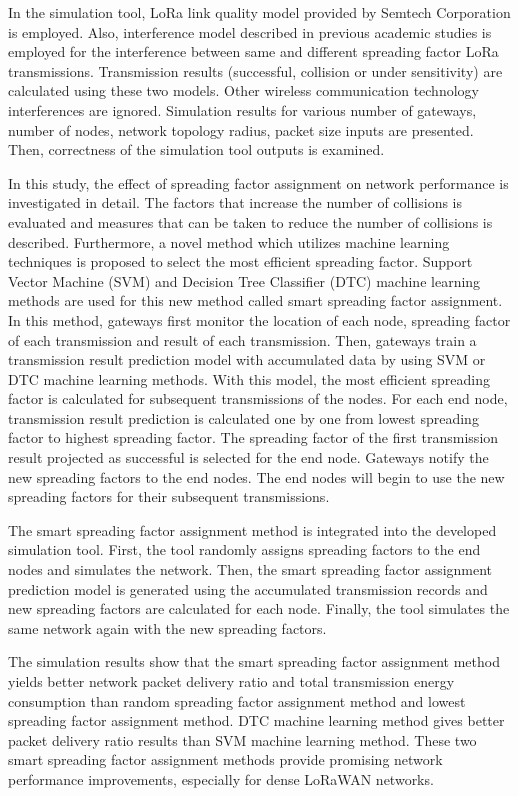 In the simulation tool, LoRa link quality model provided by Semtech Corporation is employed. Also, interference model described in previous academic studies is employed for the interference between same and different spreading factor LoRa transmissions. Transmission results (successful, collision or under sensitivity) are calculated using these two models. Other wireless communication technology interferences are ignored. Simulation results for various number of gateways, number of nodes, network topology radius, packet size inputs are presented. Then, correctness of the simulation tool outputs is examined.

In this study, the effect of spreading factor assignment on network performance is investigated in detail. The factors that increase the number of collisions is evaluated and measures that can be taken to reduce the number of collisions is described. Furthermore, a novel method which utilizes machine learning techniques is proposed to select the most efficient spreading factor. Support Vector Machine (SVM) and Decision Tree Classifier (DTC) machine learning methods are used for this new method called smart spreading factor assignment. In this method, gateways first monitor the location of each node, spreading factor of each transmission and result of each transmission. Then, gateways train a transmission result prediction model with accumulated data by using SVM or DTC machine learning methods. With this model, the most efficient spreading factor is calculated for subsequent transmissions of the nodes. For each end node, transmission result prediction is calculated one by one from lowest spreading factor to highest spreading factor. The spreading factor of the first transmission result projected as successful is selected for the end node. Gateways notify the new spreading factors to the end nodes. The end nodes will begin to use the new spreading factors for their subsequent transmissions.

The smart spreading factor assignment method is integrated into the developed simulation tool. First, the tool randomly assigns spreading factors to the end nodes and simulates the network. Then, the smart spreading factor assignment prediction model is generated using the accumulated transmission records and new spreading factors are calculated for each node. Finally, the tool simulates the same network again with the new spreading factors.

The simulation results show that the smart spreading factor assignment method yields better network packet delivery ratio and total transmission energy consumption than random spreading factor assignment method and lowest spreading factor assignment method. DTC machine learning method gives better packet delivery ratio results than SVM machine learning method. These two smart spreading factor assignment methods provide promising network performance improvements, especially for dense LoRaWAN networks.
